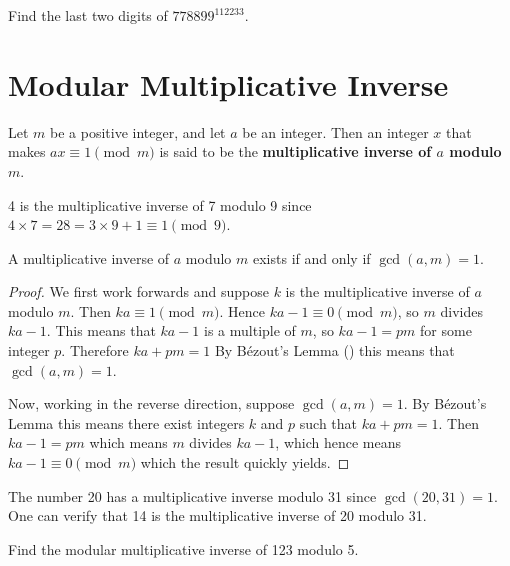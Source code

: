 \begin{exercise}
    Find the last two digits of $778899^{112233}$.
\end{exercise}

\section{Modular Multiplicative Inverse}
\begin{definition}
    Let $m$ be a positive integer, and let $a$ be an integer. Then an integer $x$ that makes $ax \equiv 1 \pmod m$ is said to be the \textbf{multiplicative inverse of $a$ modulo $m$}.
\end{definition}
\begin{example}
    4 is the multiplicative inverse of 7 modulo 9 since $4 \times 7 = 28 = 3 \times 9 + 1 \equiv 1 \pmod 9$.
\end{example}

\begin{proposition}\label{prop-multiplicative-inverse-exists-iff-coprime}
    A multiplicative inverse of $a$ modulo $m$ exists if and only if $\gcd(a,m) = 1$.
\end{proposition}
\begin{proof}
    We first work forwards and suppose $k$ is the multiplicative inverse of $a$ modulo $m$. Then $ka \equiv 1 \pmod m$. Hence $ka - 1 \equiv 0 \pmod m$, so $m$ divides $ka - 1$. This means that $ka - 1$ is a multiple of $m$, so $ka - 1 = pm$ for some integer $p$. Therefore $ka + pm = 1$ By B\'{e}zout's Lemma () this means that $\gcd(a, m) = 1$.
    
    Now, working in the reverse direction, suppose $\gcd(a, m) = 1$. By B\'{e}zout's Lemma this means there exist integers $k$ and $p$ such that $ka + pm = 1$. Then $ka - 1 = pm$ which means $m$ divides $ka - 1$, which hence means $ka - 1 \equiv 0 \pmod m$ which the result quickly yields.
\end{proof}

\begin{example}
    The number 20 has a multiplicative inverse modulo 31 since $\gcd(20, 31) = 1$. One can verify that 14 is the multiplicative inverse of 20 modulo 31.
\end{example}

\begin{exercise}
    Find the modular multiplicative inverse of 123 modulo 5.
\end{exercise}

